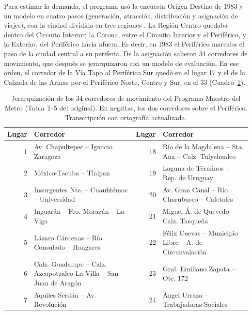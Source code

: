 Para estimar la demanda, el programa usó la encuesta Origen-Destino de 1983 y un
modelo en cuatro pasos (generación, atracción, distribución y asignación de
viajes), con la ciudad dividida en tres regiones
\citep[pp.~54--58]{ddf1985programa}. La Región Centro quedaba dentro del
Circuito Interior; la Corona, entre el Circuito Interior y el Periférico, y la
Exterior, del Periférico hacia afuera. Es decir, en 1983 el Periférico marcaba
el paso de la ciudad central a su periferia. De la asignación salieron 34
corredores de movimiento, que después se jerarquizaron con un modelo de
evaluación. En ese orden, el corredor de la Vía Tapo al Periférico Sur quedó en
el lugar 17 y el de la Calzada de las Armas por el Periférico Norte, Centro y
Sur, en el 33 (Cuadro~\ref{tab:anillo-pm-corredores}).

\begin{table}[H]
    \centering
    \caption[Corredores de movimiento del Programa Maestro del Metro]{%
    Jerarquización de los 34 corredores de movimiento del Programa Maestro del
    Metro (Tabla T-5 del original). En negritas, los dos corredores sobre el
    Periférico. Transcripción con ortografía actualizada.}
    \label{tab:anillo-pm-corredores}
    \small
    \setlength{\tabcolsep}{4pt}
    \begin{tabularx}{\textwidth}{|r|X|r|X|}
        \hline
        \textbf{Lugar} & \textbf{Corredor} & \textbf{Lugar} & \textbf{Corredor} \\
        \hline
        1  & Av. Chapultepec -- Ignacio Zaragoza &
        18 & Río de la Magdalena -- Sta. Ana -- Calz. Tulyehualco \\
        2  & México-Tacuba -- Tlalpan &
        19 & Laguna de Términos -- Rep. de Uruguay \\
        3  & Insurgentes Nte. -- Cuauhtémoc -- Universidad &
        20 & Av. Gran Canal -- Río Churubusco -- Cafetales \\
        4  & Inguarán -- Fco. Morazán -- La Viga &
        21 & Miguel Á. de Quevedo -- Calz. Tasqueña \\
        5  & Lázaro Cárdenas -- Río Consulado -- Hangares &
        22 & Félix Cuevas -- Municipio Libre -- A. de Circunvalación \\
        6  & Calz. Guadalupe -- Calz. Azcapotzalco-La Villa -- San Juan de Aragón &
        23 & Gral. Emiliano Zapata -- Ote. 172 \\
        7  & Aquiles Serdán -- Av. Revolución &
        24 & Ángel Urraza -- Trabajadoras Sociales \\

\end{tabularx}
\end{table}
